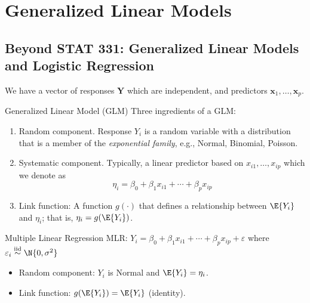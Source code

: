 \chapter{Generalized Linear Models}
\section{Beyond STAT 331:
  Generalized Linear Models and Logistic Regression}
We have a vector of responses $ \symbf{Y} $
which are independent, and predictors
$ \symbf{x}_1,\ldots,\symbf{x}_p $.
\begin{Definition}{Generalized Linear Model (GLM)}{}
    Three ingredients of a GLM\@:
    \begin{enumerate}
        \item Random component. Response $ Y_i $ is a random
              variable with a distribution that is a member of the
              \emph{exponential family}, e.g., Normal,
              Binomial, Poisson.
        \item Systematic component. Typically, a linear predictor
              based on $ x_{i1},\ldots,x_{ip} $ which we denote as
              \[ \eta_i=\beta_0+\beta_1x_{i1}+\cdots+\beta_p x_{i p} \]
        \item Link function: A function $ g(\cdot) $ that defines
              a relationship between $ \E{Y_i} $ and $ \eta_i $;
              that is, $ \eta_i=g(\E{Y_i}) $.
    \end{enumerate}
\end{Definition}
\begin{Example}{Multiple Linear Regression}{}
    MLR\@: $ Y_i=\beta_0+\beta_1x_{i1}+\cdots+\beta_p x_{i p}+\varepsilon $
    where $ \varepsilon_i\stackrel{\text{iid}}{\sim}\N{0,\sigma^2} $
    \begin{itemize}
        \item Random component: $ Y_i $ is Normal and $ \E{Y_i}=\eta_i $.
        \item Link function: $ g(\E{Y_i})=\E{Y_i} $ (identity).
    \end{itemize}
\end{Example}
